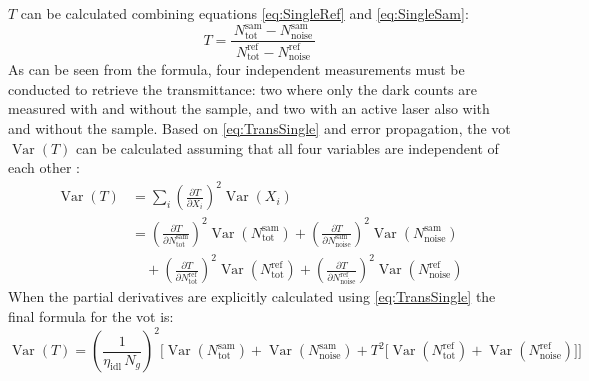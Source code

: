 $T$ can be calculated combining equations \ref{eq:SingleRef} and \ref{eq:SingleSam}:
\begin{equation}
	T = 
	\frac{\,N_{\text{tot}}^{\text{sam}} - N_{\text{noise}}^{\text{sam}}\,}
	{\,N_{\text{tot}}^{\text{ref}} - N_{\text{noise}}^{\text{ref}}\,}
	\label{eq:TransSingle}
\end{equation}
As can be seen from the formula, four independent measurements must be conducted to retrieve the transmittance: two where only the dark counts are measured with and without the sample, and two with an active laser also with and without the sample. 
\newpage
Based on \autoref{eq:TransSingle} and error propagation, the \acrshort{vot} $\operatorname{Var}(T)$ can be calculated assuming that all four variables are independent of each other \cite{kuNotesUsePropagation1966}: 
\begin{equation}
	\begin{aligned}
		\operatorname{Var}(T) 
		&= \sum_{i} \left( \frac{\partial T}{\partial X_i} \right)^{2} 
		\operatorname{Var}\!\left( X_i \right) \\[0.75em]
		&= \left( \frac{\partial T}{\partial N_{\text{tot}}^{\text{sam}}} \right)^{2} 
		\operatorname{Var}\!\left( N_{\text{tot}}^{\text{sam}} \right)
		+ \left( \frac{\partial T}{\partial N_{\text{noise}}^{\text{sam}}} \right)^{2} 
		\operatorname{Var}\!\left( N_{\text{noise}}^{\text{sam}} \right) \\[0.75em]
		&\quad + \left( \frac{\partial T}{\partial N_{\text{tot}}^{\text{ref}}} \right)^{2} 
		\operatorname{Var}\!\left( N_{\text{tot}}^{\text{ref}} \right)
		+ \left( \frac{\partial T}{\partial N_{\text{noise}}^{\text{ref}}} \right)^{2} 
		\operatorname{Var}\!\left( N_{\text{noise}}^{\text{ref}} \right)
	\end{aligned}
	\label{eq:VarianceTransGen}
\end{equation}
When the partial derivatives are explicitly calculated using \autoref{eq:TransSingle} the final formula for the \acrshort{vot} is:
\begin{equation}
		\operatorname{Var}(T) 
		= \left( \frac{1}{\eta_{\text{idl}}\,N_g} \right)^{2}
		\Bigg[
		\operatorname{Var}\!\left(N_{\text{tot}}^{\text{sam}}\right) 
		+ \operatorname{Var}\!\left(N_{\text{noise}}^{\text{sam}}\right) 
		+ T^{2} \Big[ 
		\operatorname{Var}\!\left(N_{\text{tot}}^{\text{ref}}\right) 
		+ \operatorname{Var}\!\left(N_{\text{noise}}^{\text{ref}}\right) 
		\Big]
		\Bigg]
	\label{eq:VarianceTransExpl}
\end{equation}
